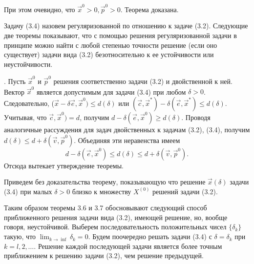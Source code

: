 При этом очевидно, что $\overrightarrow{x}^0 > 0, \overrightarrow{p}^0 > 0.$ Теорема доказана.

Задачу (3.4) назовем регуляризованной по отношению к задаче (3.2). Следующие две теоремы показывают, что с помощью решения регуляризованной задачи в принципе можно найти с любой степенью точности решение (если оно существует) задачи вида (3.2) безотносительно к ее устойчивости или неустойчивости.


. Пусть $\overrightarrow{x}^0$ и $\overrightarrow{p}^0$ решения соответственно задачи (3.2) и двойственной к ней. Вектор $\overrightarrow{x}^0$ является допустимым для задачи (3.4) при любом $\delta > 0$. Следовательно, ($\overrightarrow{x} - \delta\overrightarrow{e},\overrightarrow{x}^0) \leq d(\delta)$ или $(\overrightarrow{c},\overrightarrow{x}^*) - \delta(\overrightarrow{e},\overrightarrow{x}^*) \leq d(\delta)$. Учитывая, что $\overrightarrow{c},\overrightarrow{x}^0) = d$, получим $d - \delta(\overrightarrow{e},\overrightarrow{x}^0) \geq d(\delta)$. Проводя аналогичные рассуждения для задач двойственных к задачам (3.2), (3.4), получим $d(\delta) \leq d + \delta(\overrightarrow{v},\overrightarrow{p}^0)$. Объединяя эти неравенства имеем $$d - \delta(\overrightarrow{e},\overrightarrow{x}^0) \leq d(\delta) \leq d + \delta(\overrightarrow{v},\overrightarrow{p}^0).$$
Отсюда вытекает утверждение теоремы.

Приведем без доказательства теорему, показывающую что решение $\overrightarrow{x}(\delta)$ задачи (3.4) при малых $\delta > 0$ близко к множеству $X^{(0)}$ решений задачи (3.2).


Таким образом теоремы 3.6 и 3.7 обосновывают следующий способ приближенного решения задачи вида (3.2), имеющей решение, но, вообще говоря, неустойчивой. Выберем последовательность положительных чисел $\{\delta_k\}$ такую, что $\lim_{k \rightarrow \inf} \delta_k = 0$. Будем поочередно решать задачи (3.4) с $\delta = \delta_k$ при $k = l, 2, \dots$. Решение каждой последующей задачи является более точным приближением к решению задачи (3.2), чем решение предыдущей.

